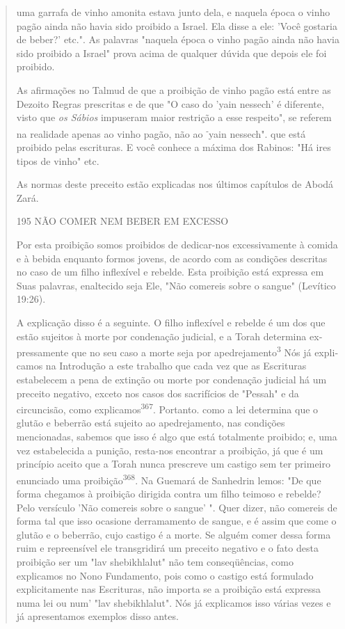 \begin{quote}uma garrafa de vinho amonita estava junto dela, e naquela época o vinho
pagão ainda não havia sido proibido a Israel. Ela disse a ele: 'Você
gostaria de beber?' etc.". As palavras "naquela época o vinho pagão
ainda não havia sido proibido a Israel" prova acima de qualquer dúvida
que depois ele foi proibido.

As afirmações no Talmud de que a proibição de vinho pagão está entre as
Dezoito Regras prescritas e de que "O caso do 'yain nessech' é
diferen­te, visto que \emph{os Sábios} impuseram maior restrição a esse
respeito", se referem na realidade apenas ao vinho pagão, não ao
\textsuperscript{-}yain nessech". que está proibido pelas escrituras. E
você conhece a máxima dos Rabinos: "Há ires tipos de vi­nho" etc.

As normas deste preceito estão explicadas nos últimos capítulos de Abodá
Zará.

195 NÃO COMER NEM BEBER EM EXCESSO

Por esta proibição somos proibidos de dedicar-nos excessivamente à
comida e à bebida enquanto formos jovens, de acordo com as condições
des­critas no caso de um filho inflexível e rebelde. Esta proibição está
expressa em Suas palavras, enaltecido seja Ele, "Não comereis sobre o
sangue" (Levítico 19:26).

A explicação disso é a seguinte. O filho inflexível e rebelde é um dos
que estão sujeitos à morte por condenação judicial, e a Torah determina
ex­pressamente que no seu caso a morte seja por
apedrejamento\textsuperscript{3} Nós já expli­camos na Introdução a este
trabalho que cada vez que as Escrituras estabele­cem a pena de extinção
ou morte por condenação judicial há um preceito ne­gativo, exceto nos
casos dos sacrifícios de "Pessah" e da circuncisão, como
explicamos\textsuperscript{367}. Portanto. como a lei determina que o
glutão e beberrão está su­jeito ao apedrejamento, nas condições
mencionadas, sabemos que isso é algo que está totalmente proibido; e,
uma vez estabelecida a punição, resta-nos en­contrar a proibição, já que
é um princípio aceito que a Torah nunca prescreve um castigo sem ter
primeiro enunciado uma proibição\textsuperscript{368}. Na Guemará de
Sa­nhedrin lemos: "De que forma chegamos à proibição dirigida contra um
filho teimoso e rebelde? Pelo versículo 'Não comereis sobre o sangue' ".
Quer di­zer, não comereis de forma tal que isso ocasione derramamento de
sangue, e é assim que come o glutão e o beberrão, cujo castigo é a
morte. Se alguém co­mer dessa forma ruim e repreensível ele transgridirá
um preceito negativo e o fato desta proibição ser um "lav shebikhlalut"
não tem conseqüências, como explicamos no Nono Fundamento, pois como o
castigo está formulado explici­tamente nas Escrituras, não importa se a
proibição está expressa numa lei ou num' "lav shebikhlalut". Nós já
explicamos isso várias vezes e já apresentamos exemplos disso antes.
\end{quote}

